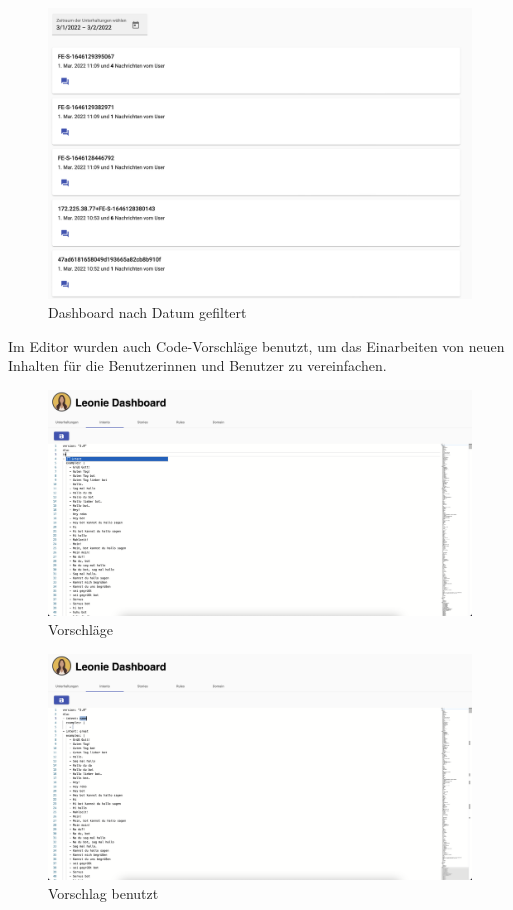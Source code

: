 \begin{figure}[hbt!]
    \centering
    \includegraphics[scale=0.3]{pics/dashboardDate}
    \caption{Dashboard nach Datum gefiltert}
    \label{fig:impl:dashboardDate}
\end{figure}

Im Editor wurden auch Code-Vorschläge benutzt, um das Einarbeiten von neuen Inhalten für die Benutzerinnen und Benutzer zu vereinfachen.

\begin{figure}[hbt!]
    \centering
    \includegraphics[scale=0.3]{pics/dashboardCodeSuggestion}
    \caption{Vorschläge}
    \label{fig:impl:dashboardCodeSuggestion}
\end{figure}
\begin{figure}[hbt!]
    \centering
    \includegraphics[scale=0.3]{pics/dashboardSuggestionMade}
    \caption{Vorschlag benutzt}
    \label{fig:impl:dashboardCodeSuggestionMade}
\end{figure}

